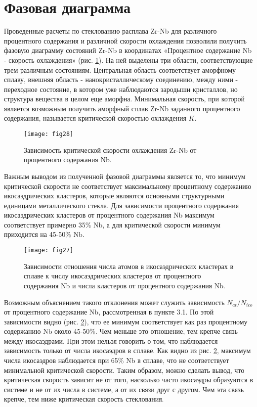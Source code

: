 \section{Фазовая диаграмма}
Проведенные расчеты по стеклованию расплава Zr-Nb для различного процентного содержания и различной скорости охлаждения позволили получить фазовую диаграмму состояний Zr-Nb в координатах «Процентное содержание Nb - скорость охлаждения» (рис. \ref{K(T)}). На ней выделены три области, соответствующие трем различным состояниям. Центральная область соответствует аморфному сплаву, внешняя область - нанокристаллическому соединению, между ними - переходное состояние, в котором уже наблюдаются зародыши кристаллов, но структура вещества в целом еще аморфна. Минимальная скорость, при которой является возможным получить аморфный сплав Zr-Nb заданного процентного содержания, называется критической скоростью охлаждения $K$. 
\begin{figure}[h!]
	\begin{center}
		\texttt{[image: fig28]}{}{}{}
		\caption{Зависимость критической скорости охлаждения Zr-Nb от процентного содержания Nb.}
		\label{K(T)}
	\end{center}
\end{figure}
Важным выводом из полученной фазовой диаграммы  является то, что минимум критической скорости не соответствует максимальному процентному содержанию икосаэдрических кластеров, которые являются основными структурными единицами металлического стекла. Для зависимости процентного содержания икосаэдрических кластеров от процентного содержания Nb максимум соответствует примерно 35\% Nb, а для критической скорости минимум приходится на 45-50\% Nb. 

\begin{figure}[h!]
	\begin{center}
		\texttt{[image: fig27]}{}{}{}
		\caption{Зависимости отношения числа атомов в икосаэдрических кластерах в сплаве к числу икосаэдрических  кластеров от процентного содержания Nb и числа кластеров от процентного содержания Nb.}
		\label{icocenterofico}
	\end{center}
\end{figure}
Возможным объяснением такого отклонения может служить зависимость $N_{at}/N_{ico}$ от процентного содержание Nb, рассмотренная  в пункте 3.1. По этой зависимости видно (рис. \ref{icocenterofico}), что ее минимум соответствует как раз процентному содержанию Nb около 45-50\%. Чем меньше это отношение, тем крепче связь между икосаэдрами. При этом нельзя говорить о том, что наблюдается зависимость только от числа икосаэдров в сплаве. Как видно из рис. \ref{icocenterofico}, максимум числа икосаэдров наблюдается при 65\% Nb в сплаве, что не соответствует минимальной критической скорости. Таким образом, можно сделать вывод, что критическая скорость зависит не от того, насколько часто икосаэдры образуются в системе и не от их числа в системе,  а  от их связи друг с другом. Чем эта связь крепче, тем ниже  критическая скорость стеклования.



